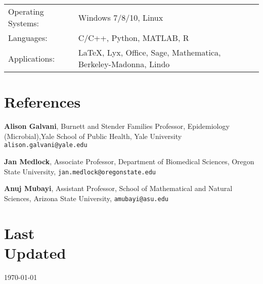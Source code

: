 \documentclass[margin,line,pifont,palatino,courier]{res}
\begin{document}
\begin{resume}
\begin{tabular}{@{}p{1.2in}p{6in}}

Operating Systems:& Windows 7/8/10, Linux\\
Languages: & C/C++, Python, MATLAB, R \\
Applications: & \LaTeX, Lyx, Office, Sage, Mathematica, Berkeley-Madonna, Lindo
\end{tabular}








\section{\sc References}
{\bf Alison Galvani}, Burnett and Stender Families Professor, Epidemiology (Microbial),Yale School of Public Health, Yale University
\texttt{alison.galvani@yale.edu}

{\bf Jan Medlock}, Associate Professor, Department of Biomedical Sciences,
Oregon State University,
\texttt{jan.medlock@oregonstate.edu}

{\bf Anuj Mubayi}, Assistant Professor, School of Mathematical and
Natural Sciences, Arizona State University,
\texttt{amubayi@asu.edu}






\section{\sc Last \\ Updated}  \today

\end{resume}
\end{document}

